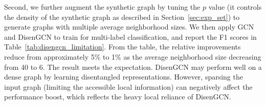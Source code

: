 \documentclass[accepted]{uai2021} %
\begin{document}
Second, we further augment the synthetic graph by tuning the $p$ value (it controls the density of the synthetic graph as described in Section~\ref{sec:exp_set}) to generate graphs with multiple average neighborhood sizes. We then apply GCN~\citep{Kipf2017SemiSupervisedCW} and DisenGCN to train for multi-label classification, and report the F1 scores in Table~\ref{tab:disengcn_limitation}. From the table, the relative improvements reduce from approximately 5\% to 1\% as the average neighborhood size decreasing from 40 to 6. The result meets the expectation. DisenGCN may perform well on a dense graph by learning disentangled representations. However, sparsing the input graph (limiting the accessible local information) can negatively affect the performance boost, which reflects the heavy local reliance of DisenGCN.



\end{document}
